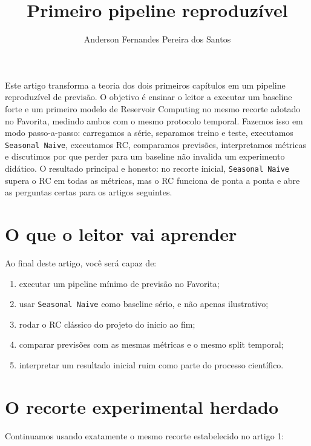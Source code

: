 \documentclass[12pt]{article}
\title{Primeiro pipeline reproduzível}
\author{Anderson Fernandes Pereira dos Santos}
\providecommand{\tightlist}{%
              \setlength{\itemsep}{0pt}\setlength{\parskip}{0pt}}
\begin{document}
            \maketitle

            \begin{resumo}
            Este artigo transforma a teoria dos dois primeiros capítulos em um pipeline reproduzível de previsão. O objetivo é ensinar o leitor a executar um baseline forte e um primeiro modelo de Reservoir Computing no mesmo recorte adotado no Favorita, medindo ambos com o mesmo protocolo temporal. Fazemos isso em modo passo-a-passo: carregamos a série, separamos treino e teste, executamos \texttt{Seasonal\ Naive}, executamos RC, comparamos previsões, interpretamos métricas e discutimos por que perder para um baseline não invalida um experimento didático. O resultado principal e honesto: no recorte inicial, \texttt{Seasonal\ Naive} supera o RC em todas as métricas, mas o RC funciona de ponta a ponta e abre as perguntas certas para os artigos seguintes.
            \end{resumo}

            \section{O que o leitor vai aprender}\label{1-o-que-o-leitor-vai-aprender}

Ao final deste artigo, você será capaz de:

\begin{enumerate}
\def\labelenumi{\arabic{enumi}.}
\tightlist
\item
  executar um pipeline mínimo de previsão no Favorita;
\item
  usar \texttt{Seasonal\ Naive} como baseline sério, e não apenas ilustrativo;
\item
  rodar o RC clássico do projeto do inicio ao fim;
\item
  comparar previsões com as mesmas métricas e o mesmo split temporal;
\item
  interpretar um resultado inicial ruim como parte do processo científico.
\end{enumerate}

\section{O recorte experimental herdado}\label{2-o-recorte-experimental-herdado}

Continuamos usando exatamente o mesmo recorte estabelecido no artigo 1:
\end{document}
